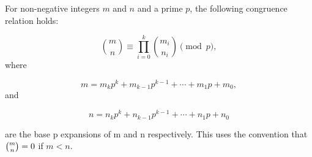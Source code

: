 For non-negative integers $m$ and $n$ and a prime $p$, the following congruence relation holds:

$${\displaystyle {\binom {m}{n}}\equiv \prod _{i=0}^{k}{\binom {m_{i}}{n_{i}}}{\pmod {p}},}$$
where

$${\displaystyle m=m_{k}p^{k}+m_{k-1}p^{k-1}+\cdots +m_{1}p+m_{0},}$$
and

$${\displaystyle n=n_{k}p^{k}+n_{k-1}p^{k-1}+\cdots +n_{1}p+n_{0}}$$

are the base p expansions of m and n respectively. This uses the convention that ${\displaystyle {\tbinom {m}{n}}=0}$ if $m < n$.
